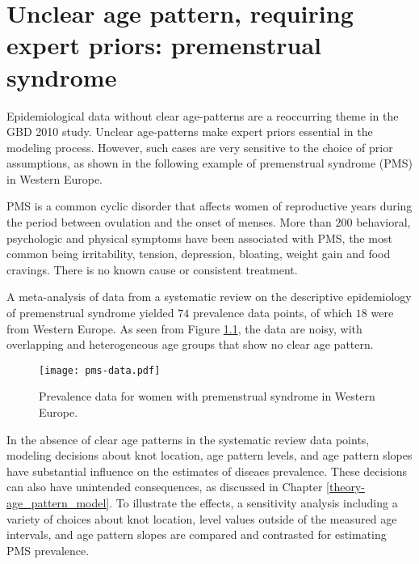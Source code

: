 \chapter{Unclear age pattern, requiring expert priors: premenstrual syndrome}
\label{applications-priors_knots_select}

Epidemiological data without clear age-patterns are a reoccurring
theme in the GBD 2010 study.  Unclear age-patterns make expert priors
essential in the modeling process.  However, such cases are very
sensitive to the choice of prior assumptions, as shown in the
following example of premenstrual syndrome (PMS) in Western Europe.

PMS is a common cyclic disorder that affects women of reproductive
years during the period between ovulation and the onset of menses.
More than $200$ behavioral, psychologic and physical symptoms have been
associated with PMS, the most common being irritability, tension,
depression, bloating, weight gain and food cravings.  There is no
known cause or consistent
treatment. \cite{dickerson_premenstrual_2003, singh_incidence_1998,
  goodale_alleviation_1990}

A meta-analysis of data from a systematic review on the descriptive
epidemiology of premenstrual syndrome yielded $74$ prevalence
data points, of which $18$ were from Western Europe.  As seen from Figure
\ref{fig:app-pms_data}, the data are noisy, with overlapping and
heterogeneous age groups that show no clear age pattern.

    \begin{figure}[h]
        \begin{center}
            \texttt{[image: pms-data.pdf]}
            \caption{Prevalence data for women with premenstrual
              syndrome in Western Europe.}
        \end{center}
        \label{fig:app-pms_data}
    \end{figure}

In the absence of clear age patterns in the systematic review data
points, modeling decisions about knot location, age pattern levels,
and age pattern slopes have substantial influence on the estimates of
diseaes prevalence.  These decisions can also have unintended
consequences, as discussed in Chapter \ref{theory-age_pattern_model}.
To illustrate the effects, a sensitivity analysis including a variety 
of choices about knot location,
level values outside of the measured age intervals, and age pattern
slopes are compared and contrasted for estimating PMS prevalence.

